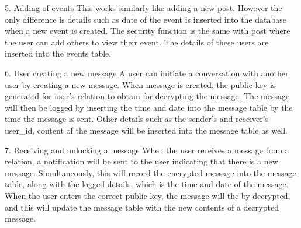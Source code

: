 5. Adding of events
This works similarly like adding a new post. However the only difference is  details such as date of the event is inserted into the database when a new event is created. The security function is the same with post where the user can add others to view their event. The details of these users are inserted into the events table. 

6. User creating a new message
A user can initiate a conversation with another user by creating a new message. When message is created, the public key is generated for user's relation to obtain for decrypting the message. The message will then be logged by inserting the time and date into the message table by the time the message is sent. Other details such as the sender's and receiver's user_id, content of the message will be inserted into the message table as well. 

7. Receiving and unlocking a message
When the user receives a message from a relation, a notification will be sent to the user indicating that there is a new message. Simultaneously, this will record the encrypted message into the message table, along with the logged details, which is the time and date of the message. When the user enters the correct public key, the message will the by decrypted, and this will update the message table with the new contents of a decrypted message. 

